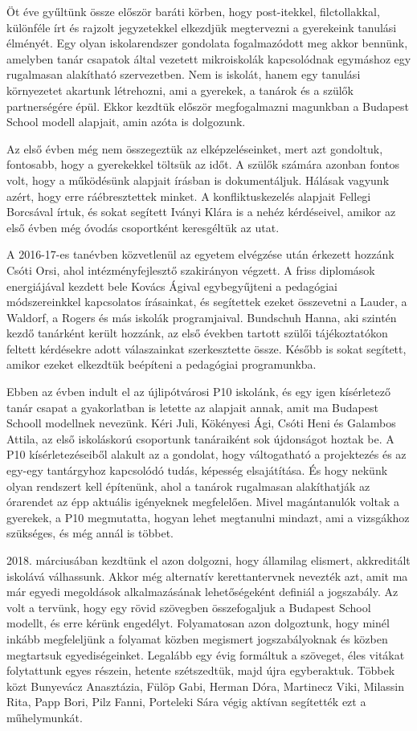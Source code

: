 Öt éve gyűltünk össze először baráti körben, hogy post-itekkel, filctollakkal, különféle írt és rajzolt jegyzetekkel elkezdjük megtervezni a gyerekeink tanulási élményét. Egy olyan iskolarendszer gondolata fogalmazódott meg akkor bennünk, amelyben tanár csapatok által vezetett mikroiskolák kapcsolódnak egymáshoz egy rugalmasan alakítható szervezetben. Nem is iskolát, hanem egy tanulási környezetet akartunk létrehozni, ami a gyerekek, a tanárok és a szülők  partnerségére épül. Ekkor kezdtük először megfogalmazni magunkban a Budapest School modell alapjait, amin azóta is dolgozunk.     
 
Az első évben még nem összegeztük az elképzeléseinket, mert azt gondoltuk, fontosabb, hogy a gyerekekkel töltsük az időt. A szülők számára azonban fontos volt, hogy a működésünk alapjait írásban is dokumentáljuk. Hálásak vagyunk azért, hogy erre ráébresztettek minket. A konfliktuskezelés alapjait Fellegi Borcsával írtuk, és sokat segített Iványi Klára is a nehéz kérdéseivel, amikor az első évben még óvodás csoportként keresgéltük az utat.
 
A 2016-17-es tanévben közvetlenül az egyetem elvégzése után érkezett hozzánk Csóti Orsi, ahol  intézményfejlesztő szakirányon végzett. A friss diplomások energiájával kezdett bele  Kovács Ágival egybegyűjteni a pedagógiai módszereinkkel kapcsolatos írásainkat, és segítettek ezeket összevetni a Lauder, a Waldorf, a Rogers és más iskolák programjaival. Bundschuh Hanna, aki szintén kezdő tanárként került hozzánk, az első években tartott szülői tájékoztatókon feltett kérdésekre adott válaszainkat szerkesztette össze. Később is sokat segített, amikor ezeket elkezdtük beépíteni a pedagógiai programunkba.
 
Ebben az évben indult el az újlipótvárosi P10 iskolánk, és egy igen kísérletező tanár csapat a gyakorlatban is letette az alapjait annak, amit ma Budapest Schooll modellnek nevezünk.
Kéri Juli, Kökényesi Ági, Csóti Heni és Galambos Attila, az első iskoláskorú csoportunk tanáraiként sok újdonságot hoztak be. A P10 kísérletezéseiből alakult az a gondolat, hogy váltogatható a projektezés és az egy-egy tantárgyhoz kapcsolódó tudás, képesség elsajátítása. És hogy nekünk olyan rendszert kell építenünk, ahol a tanárok rugalmasan alakíthatják az órarendet az épp aktuális igényeknek megfelelően. Mivel magántanulók voltak a gyerekek, a P10 megmutatta, hogyan lehet megtanulni mindazt, ami a vizsgákhoz szükséges, és még annál is többet.
 
2018. márciusában kezdtünk el azon dolgozni, hogy államilag elismert, akkreditált iskolává válhassunk. Akkor még alternatív kerettantervnek nevezték azt, amit ma már egyedi megoldások alkalmazásának lehetőségeként definiál a jogszabály. Az volt a tervünk, hogy egy rövid szövegben összefogaljuk a Budapest School modellt, és erre kérünk engedélyt. Folyamatosan azon dolgoztunk, hogy minél inkább megfeleljünk a folyamat közben megismert jogszabályoknak és közben megtartsuk egyediségeinket. Legalább egy évig formáltuk a szöveget, éles vitákat folytattunk egyes részein, hetente szétszedtük, majd újra egyberaktuk. Többek közt Bunyevácz Anasztázia, Fülöp Gabi, Herman Dóra, Martinecz Viki, Milassin Rita, Papp Bori, Pilz Fanni, Porteleki Sára végig aktívan segítették ezt a műhelymunkát.
 
